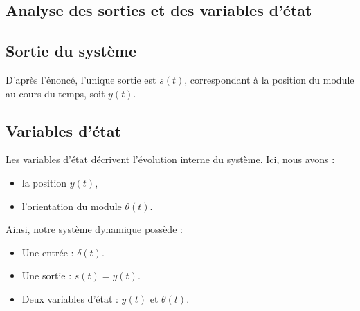 \documentclass[a4paper, 11pt]{article}
\begin{document}
\begin{enumerate}
\section*{Analyse des sorties et des variables d’état}  

\subsection*{Sortie du système}  
D’après l’énoncé, l’unique sortie est \( s(t) \), correspondant à la position du module au cours du temps, soit \( y(t) \).  

\subsection*{Variables d’état}  
Les variables d’état décrivent l’évolution interne du système. Ici, nous avons :  
\begin{itemize}
    \item la position \( y(t) \),  
    \item l’orientation du module \( \theta(t) \).  
\end{itemize}

Ainsi, notre système dynamique possède :  
\begin{itemize}
    \item Une entrée : \( \delta(t) \).  
    \item Une sortie : \( s(t) = y(t) \).  
    \item Deux variables d’état : \( y(t) \) et \( \theta(t) \).  
\end{itemize}


\end{enumerate}
\end{document}
